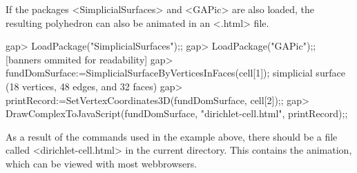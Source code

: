 If the packages <SimplicialSurfaces> and <GAPic> are also loaded, the resulting polyhedron can also be animated in an <.html> file.

\beginexample
gap> LoadPackage("SimplicialSurfaces");;
gap> LoadPackage("GAPic");;
[banners ommited for readability]
gap> fundDomSurface:=SimplicialSurfaceByVerticesInFaces(cell[1]);
simplicial surface (18 vertices, 48 edges, and 32 faces)
gap> printRecord:=SetVertexCoordinates3D(fundDomSurface, cell[2]);;
gap> DrawComplexToJavaScript(fundDomSurface, "dirichlet-cell.html", printRecord);;
\endexample

As a result of the commands used in the example above, there should be a file called <dirichlet-cell.html> in the current directory. This contains the animation, which can be viewed with most webbrowsers.
